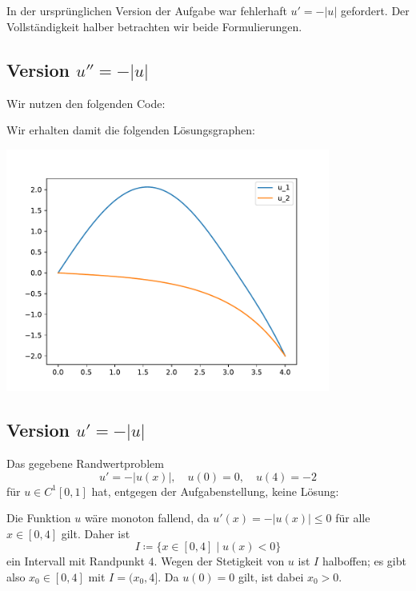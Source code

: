 \section{}

In der ursprünglichen Version der Aufgabe war fehlerhaft $u' = -|u|$ gefordert.
Der Vollständigkeit halber betrachten wir beide Formulierungen.



\subsection*{Version $u'' = -|u|$}

Wir nutzen den folgenden Code:



Wir erhalten damit die folgenden Lösungsgraphen:

\begin{center}
  \includegraphics[width = 0.8\textwidth]{chapter_04/exercise_04_22_figure_3.pdf}
\end{center}






\subsection*{Version $u' = -|u|$}

Das gegebene Randwertproblem
\[
        u' = -|u(x)|,
  \quad u(0) =  0,
  \quad u(4) = -2
\]
für $u \in C^1[0,1]$ hat, entgegen der Aufgabenstellung, keine Lösung:

Die Funktion $u$ wäre monoton fallend, da $u'(x) = -|u(x)| \leq 0$ für alle $x \in [0,4]$ gilt.
Daher ist
\[
            I
  \coloneqq \{
              x \in [0,4]
            \mid
              u(x) < 0
            \}
\]
ein Intervall mit Randpunkt $4$.
Wegen der Stetigkeit von $u$ ist $I$ halboffen;
es gibt also $x_0 \in [0,4]$ mit $I = (x_0, 4]$.
Da $u(0) = 0$ gilt, ist dabei $x_0 > 0$.

